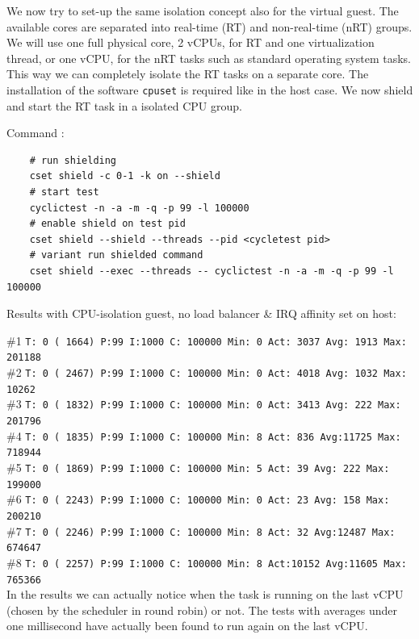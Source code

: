 \documentclass[]{scrartcl}
\begin{document}
We now try to set-up the same isolation concept also for the virtual guest. The available cores are separated into real-time (RT) and non-real-time (nRT) groups. 
We will use one full physical core, 2 vCPUs, for RT and one virtualization thread, or one vCPU, for the nRT tasks such as standard operating system tasks. 
This way we can completely isolate the RT tasks on a separate core. The installation of the software \texttt{cpuset} is required like in the host case. We now shield and start the RT task in a isolated CPU group. 

\noindent Command : 

\begin{verbatim}
	# run shielding
	cset shield -c 0-1 -k on --shield
	# start test
	cyclictest -n -a -m -q -p 99 -l 100000
	# enable shield on test pid
	cset shield --shield --threads --pid <cycletest pid>
	# variant run shielded command
	cset shield --exec --threads -- cyclictest -n -a -m -q -p 99 -l 100000
\end{verbatim}

\noindent Results with CPU-isolation guest, no load balancer \& IRQ affinity set on host:

\noindent \#1 \small \texttt{T: 0 ( 1664) P:99 I:1000 C: 100000 Min: 0 Act: 3037 Avg: 1913 Max:  201188}\\
\noindent \#2 \small \texttt{T: 0 ( 2467) P:99 I:1000 C: 100000 Min:      0 Act: 4018 Avg: 1032 Max:   10262}\\
\noindent \#3 \small \texttt{T: 0 ( 1832) P:99 I:1000 C: 100000 Min:      0 Act: 3413 Avg:  222 Max:  201796}\\
\noindent \#4 \small \texttt{T: 0 ( 1835) P:99 I:1000 C: 100000 Min:      8 Act:  836 Avg:11725 Max:  718944}\\
\noindent \#5 \small \texttt{T: 0 ( 1869) P:99 I:1000 C: 100000 Min:      5 Act:   39 Avg:  222 Max:  199000}\\
\noindent \#6 \small \texttt{T: 0 ( 2243) P:99 I:1000 C: 100000 Min:      0 Act:   23 Avg:  158 Max:  200210}\\
\noindent \#7 \small \texttt{T: 0 ( 2246) P:99 I:1000 C: 100000 Min:      8 Act:   32 Avg:12487 Max:  674647}\\
\noindent \#8 \small \texttt{T: 0 ( 2257) P:99 I:1000 C: 100000 Min:      8 Act:10152 Avg:11605 Max:  765366}\\

In the results we can actually notice when the task is running on the last vCPU (chosen by the scheduler in round robin) or not. The tests with averages under one millisecond have actually been found to run again on the last vCPU. 
\end{document}

